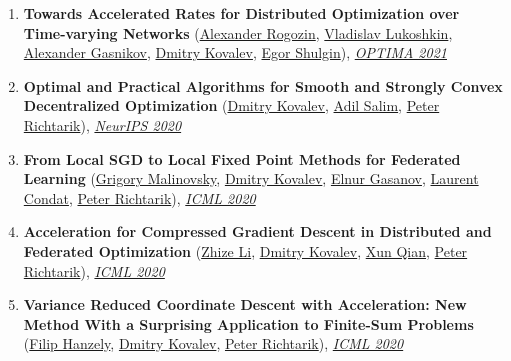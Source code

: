 \begin{enumerate}
\item \textbf{Towards Accelerated Rates for Distributed Optimization over Time-varying Networks} (\href{https://scholar.google.com/citations?user=sEjyzkgAAAAJ}{\color{linkcolour}Alexander Rogozin}, \href{}{\color{linkcolour}Vladislav Lukoshkin}, \href{https://scholar.google.ru/citations?user=AmeE8qkAAAAJ}{\color{linkcolour}Alexander Gasnikov}, \href{https://www.dmitry-kovalev.com}{\color{linkcolour}Dmitry Kovalev}, \href{https://shulgin-egor.github.io}{\color{linkcolour}Egor Shulgin}), \href{https://link.springer.com/chapter/10.1007/978-3-030-91059-4_19}{\em \color{black}OPTIMA 2021}
\item \textbf{Optimal and Practical Algorithms for Smooth and Strongly Convex Decentralized Optimization} (\href{https://www.dmitry-kovalev.com}{\color{linkcolour}Dmitry Kovalev}, \href{https://adil-salim.github.io}{\color{linkcolour}Adil Salim}, \href{https://richtarik.org}{\color{linkcolour}Peter Richtarik}), \href{https://papers.nips.cc/paper/2020/hash/d530d454337fb09964237fecb4bea6ce-Abstract.html}{\em \color{black}NeurIPS 2020}
\item \textbf{From Local SGD to Local Fixed Point Methods for Federated Learning} (\href{https://scholar.google.com/citations?user=4w2W9KQAAAAJ}{\color{linkcolour}Grigory Malinovsky}, \href{https://www.dmitry-kovalev.com}{\color{linkcolour}Dmitry Kovalev}, \href{https://elnurgasanov.com}{\color{linkcolour}Elnur Gasanov}, \href{https://lcondat.github.io}{\color{linkcolour}Laurent Condat}, \href{https://richtarik.org}{\color{linkcolour}Peter Richtarik}), \href{http://proceedings.mlr.press/v119/malinovskiy20a.html}{\em \color{black}ICML 2020}
\item \textbf{Acceleration for Compressed Gradient Descent in Distributed and Federated Optimization} (\href{https://zhizeli.github.io}{\color{linkcolour}Zhize Li}, \href{https://www.dmitry-kovalev.com}{\color{linkcolour}Dmitry Kovalev}, \href{https://qianxunk.github.io}{\color{linkcolour}Xun Qian}, \href{https://richtarik.org}{\color{linkcolour}Peter Richtarik}), \href{http://proceedings.mlr.press/v119/li20g.html}{\em \color{black}ICML 2020}
\item \textbf{Variance Reduced Coordinate Descent with Acceleration: New Method With a Surprising Application to Finite-Sum Problems} (\href{https://fhanzely.github.io/index.html}{\color{linkcolour}Filip Hanzely}, \href{https://www.dmitry-kovalev.com}{\color{linkcolour}Dmitry Kovalev}, \href{https://richtarik.org}{\color{linkcolour}Peter Richtarik}), \href{http://proceedings.mlr.press/v119/hanzely20b.html}{\em \color{black}ICML 2020}

\end{enumerate}
